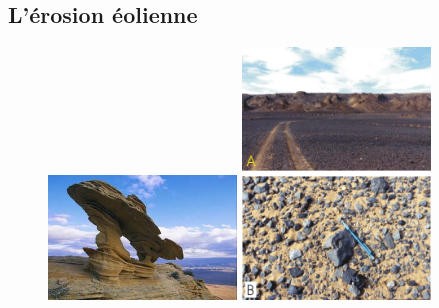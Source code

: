 \documentclass{beamer}
\begin{document}
\subsection{L'érosion éolienne}
\begin{frame}
  \begin{figure}[h]
    \includegraphics[width=5cm]{Images/Diapos/Erosion/Eolienne/Vent.jpg}
    \includegraphics[width=5cm]{Images/Diapos/Erosion/Eolienne/Vent2.jpg}
  \end{figure}
\end{frame}
\end{document}
